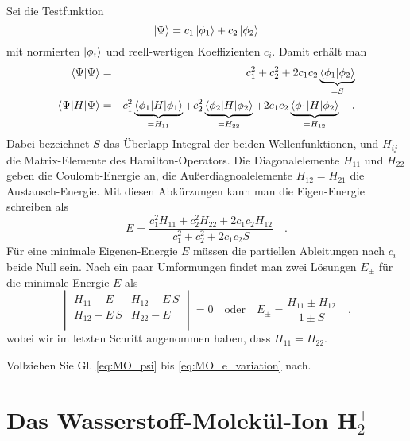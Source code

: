 Sei die Testfunktion
\begin{equation}
 \ket{\Psi} = c_1 \ket{\phi_1} + c_2 \ket{\phi_2} \label{eq:MO_psi}
\end{equation}
mit normierten  $\ket{\phi_i}$ und reell-wertigen Koeffizienten $c_i$. Damit erhält man
\begin{eqnarray}
\braket{\Psi | \Psi}  &= & c_1^2 + c_2^2  + 2 c_1 c_2 \underbrace{\braket{\phi_1 | \phi_2}}_{= S}\\
\braket{\Psi |  H | \Psi} &=& c_1^2 \underbrace{\braket{\phi_1 |  H | \phi_1 }}_{= H_{11}} +
										c_2^2 \underbrace{\braket{\phi_2 |  H | \phi_2 }}_{= H_{22}} +
								2 c_1 c_2 \underbrace{\braket{\phi_1 |  H | \phi_2 }}_{= H_{12}}  \quad .
\end{eqnarray}
Dabei bezeichnet $S$ das Überlapp-Integral der beiden Wellenfunktionen, und $H_{ij}$ die Matrix-Elemente des Hamilton-Operators. Die Diagonalelemente $H_{11}$ und $H_{22}$ geben die Coulomb-Energie an, die Außerdiagnoalelemente $H_{12} = H_{21}$ die Austausch-Energie. Mit diesen Abkürzungen kann man die Eigen-Energie schreiben als
\begin{equation}
  E = \frac{c_1^2 H_{11} + c_2^2 H_{22} + 2 c_1 c_2 H_{12}}{c_1^2 + c_2^2 + 2 c_1 c_2 S}  \quad . \label{eq:MO_e_variation}
\end{equation}
Für eine minimale Eigenen-Energie $E$ müssen die partiellen Ableitungen nach $c_i$ beide Null sein. Nach ein paar Umformungen findet man zwei Lösungen $E_\pm$ für die minimale Energie $E$ als
\begin{equation}
 \begin{vmatrix}
   H_{11} - E & H_{12} - E \, S \\  H_{12} - E \, S & H_{22} - E \\
 \end{vmatrix}
= 0
\quad
\text{oder} \quad
E_\pm = \frac{H_{11} \pm H_{12}}{1 \pm S} \quad ,
\end{equation}
wobei wir im letzten Schritt angenommen haben, dass $H_{11} = H_{22}$.


\begin{questions} 
\item Vollziehen Sie Gl. \ref{eq:MO_psi} bis \ref{eq:MO_e_variation} nach.
\end{questions}

\section{Das Wasserstoff-Molekül-Ion H$_2^+$}

